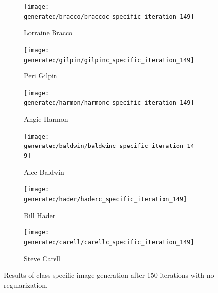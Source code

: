 \documentclass{article}
\begin{document}
\begin{figure}
	\begin{subfigure}{0.5\linewidth}
		\centering
		\texttt{[image: generated/bracco/braccoc\_specific\_iteration\_149]}
		\caption{Lorraine Bracco}
	\end{subfigure}%
	\begin{subfigure}{0.5\linewidth}
		\centering
		\texttt{[image: generated/gilpin/gilpinc\_specific\_iteration\_149]}
		\caption{Peri Gilpin}
	\end{subfigure}\vspace{1em}
	\begin{subfigure}{0.5\linewidth}
		\centering
		\texttt{[image: generated/harmon/harmonc\_specific\_iteration\_149]}
		\caption{Angie Harmon}
	\end{subfigure}%
	\begin{subfigure}{0.5\linewidth}
		\centering
		\texttt{[image: generated/baldwin/baldwinc\_specific\_iteration\_149]}
		\caption{Alec Baldwin}
	\end{subfigure}\vspace{1em}
	\begin{subfigure}{0.5\linewidth}
		\centering
		\texttt{[image: generated/hader/haderc\_specific\_iteration\_149]}
		\caption{Bill Hader}
	\end{subfigure}%
	\begin{subfigure}{0.5\linewidth}
		\centering
		\texttt{[image: generated/carell/carellc\_specific\_iteration\_149]}
		\caption{Steve Carell}
	\end{subfigure}
	\caption{Results of class specific image generation after 150 iterations with no regularization.}
	\label{fig:class-spec}
\end{figure}

\clearpage

\printbibliography
\end{document}
